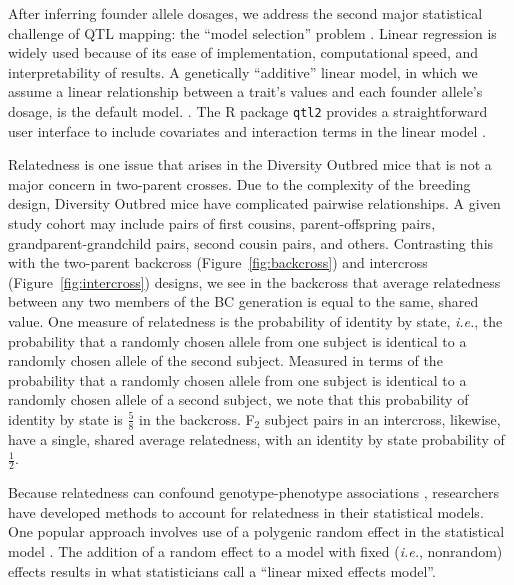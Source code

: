 \documentclass[oneside]{book}\usepackage[]{graphicx}\usepackage[]{color}
\begin{document}

After inferring founder allele dosages, we address the second major statistical challenge of 
QTL mapping: the ``model selection'' problem \citep{broman2009guide}.
Linear regression is widely used because of its ease of implementation,
computational speed, and interpretability of results.
A genetically ``additive'' linear model, in which we assume a linear relationship between
a trait's values and each founder allele's dosage, is the default model.
\citep{gatti2014quantitative,broman2019rqtl2}.
The R package \texttt{qtl2} provides a straightforward user
interface to include covariates and interaction terms in the linear model \citep{broman2019rqtl2}.




Relatedness is one issue that arises in the Diversity Outbred mice that is not a major concern in 
two-parent crosses. Due to the complexity of the breeding design, Diversity Outbred mice
have 
complicated pairwise relationships. A given study cohort may include pairs of first
cousins, parent-offspring pairs, grandparent-grandchild pairs, second cousin pairs, and others.
Contrasting this with the two-parent backcross (Figure~\ref{fig:backcross}) and
intercross (Figure~\ref{fig:intercross}) designs, we see in the backcross that
average relatedness between any two members of the BC generation is equal to the same, shared value.
One measure of relatedness is the probability of identity by state, \emph{i.e.}, the
probability that a randomly chosen allele from one subject is identical to a randomly chosen
allele of the second subject. Measured in terms of the probability that a randomly chosen allele
from one subject is identical to a randomly chosen allele of a second subject, we note that
this probability of identity by state is $\frac{5}{8}$ in the backcross. F$_2$ subject pairs in an intercross, likewise, have a single, shared average relatedness, with an identity by state probability of $\frac{1}{2}$.

Because relatedness can confound genotype-phenotype associations \citep{yang2014advantages}, researchers have developed methods to account for relatedness in their statistical models. One popular approach involves use of a polygenic random effect in the statistical model \citep{kang2008efficient}. The addition of a random effect to a model with fixed (\emph{i.e.}, nonrandom) effects results in what statisticians call a ``linear mixed effects model''. 
\end{document}
